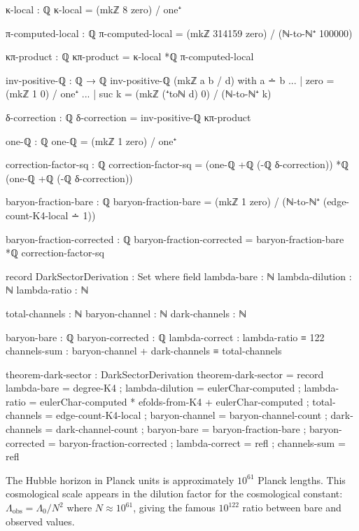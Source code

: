 \documentclass[11pt,a4paper]{book}
\begin{document}
\begin{code}
κ-local : ℚ
κ-local = (mkℤ 8 zero) / one⁺

π-computed-local : ℚ
π-computed-local = (mkℤ 314159 zero) / (ℕ-to-ℕ⁺ 100000)

κπ-product : ℚ
κπ-product = κ-local *ℚ π-computed-local

inv-positive-ℚ : ℚ → ℚ
inv-positive-ℚ (mkℤ a b / d) with a ∸ b
... | zero = (mkℤ 1 0) / one⁺
... | suc k = (mkℤ (⁺toℕ d) 0) / (ℕ-to-ℕ⁺ k)

δ-correction : ℚ
δ-correction = inv-positive-ℚ κπ-product

one-ℚ : ℚ
one-ℚ = (mkℤ 1 zero) / one⁺

correction-factor-sq : ℚ
correction-factor-sq = (one-ℚ +ℚ (-ℚ δ-correction)) *ℚ (one-ℚ +ℚ (-ℚ δ-correction))

baryon-fraction-bare : ℚ
baryon-fraction-bare = (mkℤ 1 zero) / (ℕ-to-ℕ⁺ (edge-count-K4-local ∸ 1))

baryon-fraction-corrected : ℚ
baryon-fraction-corrected = baryon-fraction-bare *ℚ correction-factor-sq
\end{code}

\begin{code}
record DarkSectorDerivation : Set where
  field
    lambda-bare : ℕ
    lambda-dilution : ℕ
    lambda-ratio : ℕ
    
    total-channels : ℕ
    baryon-channel : ℕ
    dark-channels : ℕ
    
    baryon-bare : ℚ
    baryon-corrected : ℚ
    lambda-correct : lambda-ratio ≡ 122
    channels-sum : baryon-channel + dark-channels ≡ total-channels

theorem-dark-sector : DarkSectorDerivation
theorem-dark-sector = record
  { lambda-bare = degree-K4
  ; lambda-dilution = eulerChar-computed
  ; lambda-ratio = eulerChar-computed * efolds-from-K4 + eulerChar-computed
  ; total-channels = edge-count-K4-local
  ; baryon-channel = baryon-channel-count
  ; dark-channels = dark-channel-count
  ; baryon-bare = baryon-fraction-bare
  ; baryon-corrected = baryon-fraction-corrected
  ; lambda-correct = refl
  ; channels-sum = refl
  }
\end{code}

The Hubble horizon in Planck units is approximately $10^{61}$ Planck lengths. This 
cosmological scale appears in the dilution factor for the cosmological constant: 
$\Lambda_{\text{obs}} = \Lambda_0 / N^2$ where $N \approx 10^{61}$, giving the famous 
$10^{122}$ ratio between bare and observed values.
\end{document}
